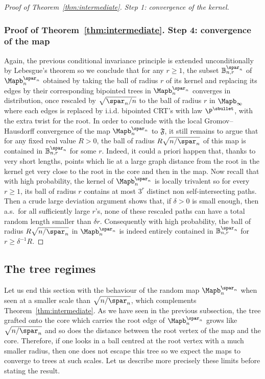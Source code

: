 \begin{proof}[Proof of Theorem~\ref{thm:intermediate}. Step 1: convergence of the kernel]
\subsubsection*{Proof of Theorem~\ref{thm:intermediate}. Step 4: convergence of the map}\enlargethispage{.5\baselineskip}%
Again, the previous conditional invariance principle is extended unconditionally by Lebesgue's theorem so we conclude that for any $r\ge 1$, the subset $\mathbb{B}_{n,r}^{\spar_n}$ of $\Mapb_n^{\spar_n}$ obtained by taking the ball of radius $r$ of its kernel and replacing its edges by their corresponding bipointed trees in $\Mapb_n^{\spar_n}$ converges in distribution, once rescaled by $\sqrt{\spar_n/n}$ to the ball of radius $r$ in $\Mapb_\infty$ where each edges is replaced by i.i.d. bipointed CRT's with law $\P^{\sbullet}$, with the extra twist for the root.
In order to conclude with the local Gromov--Hausdorff convergence of the map $\Mapb_n^{\spar_n}$ to $\mathfrak{F}$, it still remains to argue that for any fixed real value $R>0$, the ball of radius $R \sqrt{n/\spar_n}$ of this map is contained in $\mathbb{B}_{n,r}^{\spar_n}$ for some $r$. Indeed, it could a priori happen that, thanks to very short lengths, points which lie at a large graph distance from the root in the kernel get very close to the root in the core and then in the map.
Now recall that with high probability, the kernel of $\Mapb_n^{\spar_n}$ is locally trivalent so for every~$r \ge 1$, its ball of radius $r$ contains at most $3^{r}$ distinct non self-intersecting paths. Then a crude large deviation argument shows that, if $\delta>0$ is small enough, then a.s.~for all sufficiently large $r$'s, none of these rescaled paths can have a total random length smaller than $\delta r$. Consequently with high probability, the ball of radius $R \sqrt{n/\spar_n}$ in $\Mapb_n^{\spar_n}$ is indeed entirely contained in $\mathbb{B}_{n,r}^{\spar_n}$ for $r \ge \delta^{-1} R$.
\end{proof}

\subsection{The tree regimes}
\label{ssec:limites_abres}

Let us end this section with the behaviour of the random map $\Mapb_n^{\spar_n}$ when seen at a smaller scale than $\sqrt{n/\spar_n}$, which complements Theorem~\ref{thm:intermediate}. As we have seen in the previous subsection, the tree grafted onto the core which carries the root edge of $\Mapb_n^{\spar_n}$ grows like $\sqrt{n/\spar_n}$ and so does the distance between the root vertex of the map and the core. Therefore, if one looks in a ball centred at the root vertex with a much smaller radius, then one does not escape this tree so we expect the maps to converge to trees at such scales. Let us describe more precisely these limits before stating the result.

